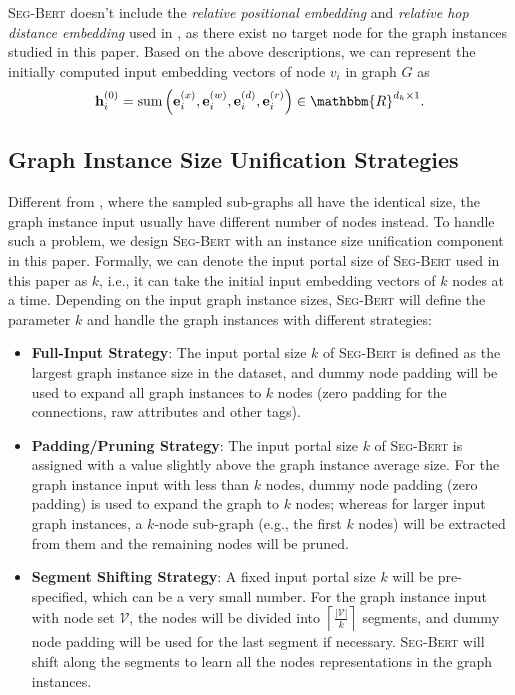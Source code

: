 \documentclass{article}
\newcommand{\mb}{\mathbf}
\newcommand{\mc}{\mathcal}
\newcommand{\our}{\textsc{Seg-Bert}}
\begin{document}
{\our} doesn't include the \textit{relative positional embedding} and \textit{relative hop distance embedding} used in \cite{zhang2020graph}, as there exist no target node for the graph instances studied in this paper. Based on the above descriptions, we can represent the initially computed input embedding vectors of node $v_i$ in graph $G$ as 
\begin{equation}\label{equ:initial_embedding}
\mb{h}^{(0)}_i = \mbox{sum} \left( \mb{e}_i^{(x)}, \mb{e}_i^{(w)}, \mb{e}_i^{(d)}, \mb{e}_i^{(r)} \right) \in \mathbbm{R}^{d_h \times 1}.
\end{equation}



\subsection{Graph Instance Size Unification Strategies}

Different from \cite{zhang2020graph}, where the sampled sub-graphs all have the identical size, the graph instance input usually have different number of nodes instead. To handle such a problem, we design {\our} with an instance size unification component in this paper. Formally, we can denote the input portal size of {\our} used in this paper as $k$, i.e., it can take the initial input embedding vectors of $k$ nodes at a time. Depending on the input graph instance sizes, {\our} will define the parameter $k$ and handle the graph instances with different strategies:
\begin{itemize}
\item \textbf{Full-Input Strategy}: The input portal size $k$ of {\our} is defined as the largest graph instance size in the dataset, and dummy node padding will be used to expand all graph instances to $k$ nodes (zero padding for the connections, raw attributes and other tags).

\item \textbf{Padding/Pruning Strategy}: The input portal size $k$ of {\our} is assigned with a value slightly above the graph instance average size. For the graph instance input with less than $k$ nodes, dummy node padding (zero padding) is used to expand the graph to $k$ nodes; whereas for larger input graph instances, a $k$-node sub-graph (e.g., the first $k$ nodes) will be extracted from them and the remaining nodes will be pruned.

\item \textbf{Segment Shifting Strategy}: A fixed input portal size $k$ will be pre-specified, which can be a very small number. For the graph instance input with node set $\mc{V}$, the nodes will be divided into $\left \lceil \frac{|\mc{V}|}{k} \right \rceil$ segments, and dummy node padding will be used for the last segment if necessary. {\our} will shift along the segments to learn all the nodes representations in the graph instances.
\end{itemize}
\end{document}
